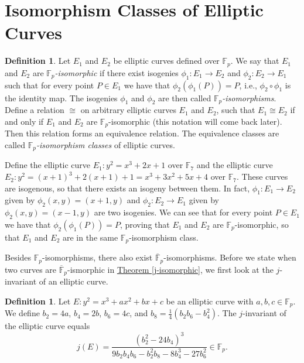 \documentclass[openany, a4paper, 10pt]{book}
\theoremstyle{plain}
\theoremstyle{plain}
\theoremstyle{plain}
\theoremstyle{definition}
\newtheorem{definition}[theorem]{Definition}
\theoremstyle{plain}
\theoremstyle{definition}
\theoremstyle{remark}
\newcommand{\theoref}[1]{\hyperref[#1]{Theorem \ref{#1}}}
\begin{document}
\section{Isomorphism Classes of Elliptic Curves}\label{sec:isom_classes}
\begin{definition}
    Let $E_1$ and $E_2$ be elliptic curves defined over $\mathbb F_p$.
    We say that $E_1$ and $E_2$ are \textit{$\mathbb F_p$-isomorphic} if there exist isogenies $\phi_1: E_1 \to E_2$ and $\phi_2: E_2 \to E_1$ such that for every point $P \in E_1$ we have that $\phi_2(\phi_1(P)) = P$, i.e., $\phi_2 \circ \phi_1$ is the identity map.
    The isogenies $\phi_1$ and $\phi_2$ are then called \textit{$\mathbb F_p$-isomorphisms}.
    Define a relation $\cong$ on arbitrary elliptic curves $E_1$ and $E_2$, such that $E_1 \cong E_2$ if and only if $E_1$ and $E_2$ are $\mathbb F_p$-isomorphic (this notation will come back later).
    Then this relation forms an equivalence relation.
    The equivalence classes are called \textit{$\mathbb F_p$-isomorphism classes} of elliptic curves.
\end{definition}


\begin{examplebox}
    Define the elliptic curve $E_1: y^2 = x^3 + 2x + 1$ over $\mathbb F_7$
    and the elliptic curve
    $E_2: y^2 = (x+1)^3 + 2(x+1) + 1 = x^3 + 3x^2 + 5x + 4$ over $\mathbb F_7$.
    These curves are isogenous, so that there exists an isogeny between them.
    In fact, $\phi_1: E_1 \to E_2$ given by $\phi_2(x,y) = (x+1, y)$ and $\phi_2: E_2 \to E_1$ given by $\phi_2(x,y) = (x-1, y)$ are two isogenies.
    We can see that for every point $P \in E_1$ we have that $\phi_2(\phi_1(P)) = P$, proving that $E_1$ and $E_2$ are $\mathbb F_p$-isomorphic, so that $E_1$ and $E_2$ are in the same $\mathbb F_p$-isomorphism class.
\end{examplebox}

Besides $\mathbb F_p$-isomorphisms, there also exist $\overline {\mathbb F}_p$-isomorphisms.
Before we state when two curves are $\overline {\mathbb F}_p$-ismorphic in \theoref{j-isomorphic}, we first look at the $j$-invariant of an elliptic curve.

\begin{definition}\label{j-inv}
    Let $E: y^2 = x^3+ax^2 + bx + c$ be an elliptic curve with $a,b,c \in \mathbb F_p$.
    We define
    $b_2 = 4a$, $b_4 = 2b$, $b_6 = 4c$, and $b_8=\frac{1}{4}(b_2b_6 - b_4^2)$.
    The $j$-invariant of the elliptic curve equals
    $$j(E) = \frac{(b_2^2 - 24b_4)^3}{9b_2b_4b_6-b_2^2 b_8 - 8b_4^3 - 27 b_6^2} \in \mathbb F_p.$$
\end{definition}
\end{document}
